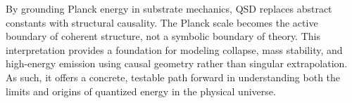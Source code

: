 \documentclass[entropy,article,submit,pdftex,moreauthors]{Definitions/mdpi}
\begin{document}
By grounding Planck energy in substrate mechanics, QSD replaces abstract constants with structural causality. The Planck scale becomes the active boundary of coherent structure, not a symbolic boundary of theory. This interpretation provides a foundation for modeling collapse, mass stability, and high-energy emission using causal geometry rather than singular extrapolation. As such, it offers a concrete, testable path forward in understanding both the limits and origins of quantized energy in the physical universe.

\vspace{6pt} 




\end{document}
